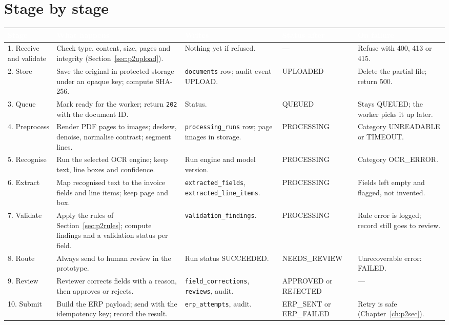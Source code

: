 \documentclass[11pt,a4paper]{report}
\newcommand{\hdr}[1]{\textcolor{white}{\sffamily\bfseries #1}}
\newcommand{\tblstart}{\rowcolors{2}{white}{rowgray}\arrayrulecolor{teal!60}}
\newcommand{\hdrrow}{\rowcolor{navy}}
\begin{document}
\section{Stage by stage}
{\tblstart\footnotesize
\begin{longtable}{L{2.3cm}L{4.3cm}L{3.3cm}L{1.9cm}L{2.2cm}}
\hdrrow \hdr{Stage} & \hdr{What happens} & \hdr{Writes} & \hdr{Status after} & \hdr{On failure}\\ . Receive and validate & Check type, content, size, pages and integrity (Section~\ref{sec:p2upload}). & Nothing yet if refused. & --- & Refuse with 400, 413 or 415.\\
2. Store & Save the original in protected storage under an opaque key; compute SHA-256. & \texttt{documents} row; audit event UPLOAD. & UPLOADED & Delete the partial file; return 500.\\
3. Queue & Mark ready for the worker; return \texttt{202} with the document ID. & Status. & QUEUED & Stays QUEUED; the worker picks it up later.\\
4. Preprocess & Render PDF pages to images; deskew, denoise, normalise contrast; segment lines. & \texttt{processing\_runs} row; page images in storage. & PROCESSING & Category UNREADABLE or TIMEOUT.\\
5. Recognise & Run the selected OCR engine; keep text, line boxes and confidence. & Run engine and model version. & PROCESSING & Category OCR\_ERROR.\\
6. Extract & Map recognised text to the invoice fields and line items; keep page and box. & \texttt{extracted\_fields}, \texttt{extracted\_line\_items}. & PROCESSING & Fields left empty and flagged, not invented.\\
7. Validate & Apply the rules of Section~\ref{sec:p2rules}; compute findings and a validation status per field. & \texttt{validation\_findings}. & PROCESSING & Rule error is logged; record still goes to review.\\
8. Route & Always send to human review in the prototype. & Run status SUCCEEDED. & NEEDS\_REVIEW & Unrecoverable error: FAILED.\\
9. Review & Reviewer corrects fields with a reason, then approves or rejects. & \texttt{field\_corrections}, \texttt{reviews}, audit. & APPROVED or REJECTED & ---\\
10. Submit & Build the ERP payload; send with the idempotency key; record the result. & \texttt{erp\_attempts}, audit. & ERP\_SENT or ERP\_FAILED & Retry is safe (Chapter~\ref{ch:p2sec}).\\
\hline
\end{longtable}}
\end{document}

